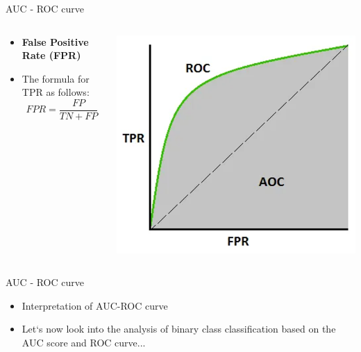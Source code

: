 \documentclass[11pt]{beamer}
\begin{document}
\begin{frame}{AUC - ROC curve}
\begin{columns}[T] %
\begin{column}{.48\textwidth}
        \begin{itemize}
		\item \textbf{False Positive Rate (FPR)}
		\item The formula for TPR as follows: $$FPR=\frac{FP}{TN+FP}$$
        \end{itemize}
\end{column}%
\hfill%
\begin{column}{.48\textwidth}
        \includegraphics[width=\linewidth]{../05-pictures/lesson-4-1_pic_3.png}
\end{column}%
\end{columns}
\end{frame}
\begin{frame}{AUC - ROC curve}
	\begin{itemize}
		\item Interpretation of AUC-ROC curve
		\item Let`s now look into the analysis of binary class classification based on the AUC score and ROC curve...
	\end{itemize}
\end{frame}
\end{document}
